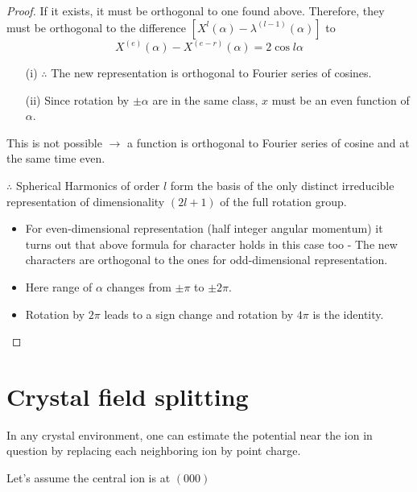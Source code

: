 \begin{proof}
If it exists, it must be orthogonal to one found above. Therefore, they must be orthogonal to the difference $[X^{l}(\alpha)-\lambda^{(l-1)}(\alpha)]$ to
$$
X^{(e)}(\alpha)-X^{(e-r)}(\alpha)=2\cos l\alpha
$$
\begin{itemize}
\item[(i)] $\therefore$ The new representation is orthogonal to Fourier series of cosines.

\item[(ii)] Since rotation by $\pm \alpha$ are in the same class, $x$ must be an even function of $\alpha$.
\end{itemize}
This is not possible $\to$ a function is orthogonal to Fourier series of cosine and at the same time even.

$\therefore$ Spherical Harmonics of order $l$ form the basis of the only distinct irreducible representation of dimensionality $(2l+1)$ of the full rotation group.
\begin{itemize}
\item For even-dimensional representation (half integer angular momentum) it turns out that above formula for character holds in this case too - The new characters are orthogonal to the ones for odd-dimensional representation.

\item Here range of $\alpha$ changes from $\pm \pi$ to $\pm 2\pi$.

\item Rotation by $2\pi$ leads to a sign change and rotation by $4\pi$ is the identity.
\end{itemize}
\end{proof}

\section*{Crystal field splitting}

In any crystal environment, one can estimate the potential near the ion in question by replacing each neighboring ion by point charge.

Let's assume the central ion is at $(000)$

